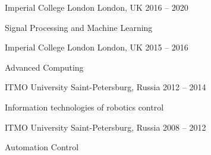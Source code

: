 

\begin{cventries}
            {Imperial College London} %
            {London, UK} %
            {2016 -- 2020} %
            {
                \begin{cvitems} %
                    \item {Signal Processing and Machine Learning}
                    \item {\lorem}
                \end{cvitems}
            }

            {Imperial College London} %
            {London, UK} %
            {2015 -- 2016} %
            {
                \begin{cvitems} %
                    \item {Advanced Computing}
                    \item {\lorem}
                \end{cvitems}
            }

            {ITMO University} %
            {Saint-Petersburg, Russia} %
            {2012 -- 2014} %
            {
                \begin{cvitems} %
                    \item {Information technologies of robotics control}
                    \item {\lorem}
                \end{cvitems}
            }

            {ITMO University} %
            {Saint-Petersburg, Russia} %
            {2008 -- 2012} %
            {
                \begin{cvitems} %
                    \item {Automation Control}
                    \item {\lorem}
                \end{cvitems}
            }
            
\end{cventries}
